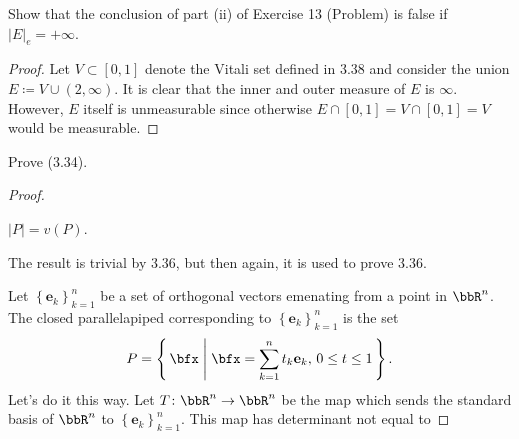 \begin{problem}
Show that the conclusion of part  (ii) of Exercise 13 (Problem) is false if
$\left|E\right|_e=+\infty$.
\end{problem}
\begin{proof}
Let $V\subset[0,1]$ denote the Vitali set defined in 3.38 and consider the
union $E\coloneqq V\cup(2,\infty)$. It is clear that the inner and outer
measure of $E$ is $\infty$. However, $E$ itself is unmeasurable since
otherwise $E\cap[0,1]=V\cap[0,1]=V$ would be measurable.
\end{proof}
\newpage

\begin{problem}
Prove (3.34).
\end{problem}
\begin{proof}
\begin{lemma*}
$\left|P\right|=v(P)$.
\end{lemma*}
The result is trivial by 3.36, but then again, it is used to prove 3.36.

Let $\left\{\mathbf{e}_k\right\}_{k=1}^n$ be a set of orthogonal vectors
emenating from a point in $\bbR^n$. The closed parallelapiped corresponding
to $\left\{\mathbf{e}_k\right\}_{k=1}^n$ is the set
\begin{equation}
\label{eq:closed-parallelapiped}
P=
\left\{\,\bfx\;\middle|\;
\text{$\bfx=\sum_{k=1}^nt_k\mathbf{e}_k$, $0\leq t\leq 1$}\,\right\}.
\end{equation}
Let's do it this way. Let $T\colon\bbR^n\to\bbR^n$ be the map which sends
the standard basis of $\bbR^n$ to
$\left\{\mathbf{e}_k\right\}_{k=1}^n$. This map has determinant not equal
to
\end{proof}
\newpage

